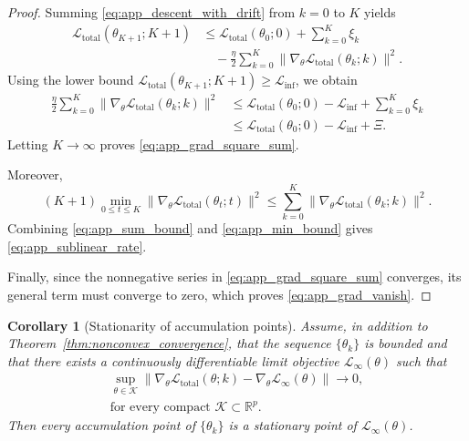 \documentclass{article}
\theoremstyle{plain}
\newtheorem{corollary}[theorem]{Corollary}
\theoremstyle{definition}
\theoremstyle{remark}
\begin{document}
\begin{proof}
	Summing \eqref{eq:app_descent_with_drift} from $k=0$ to $K$ yields
	\begin{equation}
		\begin{split}
			\mathcal{L}_{\mathrm{total}}(\theta_{K+1};K+1)
			&\leqslant
			\mathcal{L}_{\mathrm{total}}(\theta_0;0)
			+
			\sum_{k=0}^{K}\xi_k \\
			&\quad
			-
			\frac{\eta}{2}
			\sum_{k=0}^{K}
			\bigl\|
			\nabla_{\theta}\mathcal{L}_{\mathrm{total}}(\theta_k;k)
			\bigr\|^2.
		\end{split}
		\label{eq:app_telescoping}
	\end{equation}
	Using the lower bound
	$\mathcal{L}_{\mathrm{total}}(\theta_{K+1};K+1)\geqslant \mathcal{L}_{\inf}$,
	we obtain
	\begin{equation}
		\begin{split}
			\frac{\eta}{2}
			\sum_{k=0}^{K}
			\bigl\|
			\nabla_{\theta}\mathcal{L}_{\mathrm{total}}(\theta_k;k)
			\bigr\|^2
			&\leqslant
			\mathcal{L}_{\mathrm{total}}(\theta_0;0)-\mathcal{L}_{\inf}
			+\sum_{k=0}^{K}\xi_k \\
			&\leqslant
			\mathcal{L}_{\mathrm{total}}(\theta_0;0)-\mathcal{L}_{\inf}+\Xi.
		\end{split}
		\label{eq:app_sum_bound}
	\end{equation}
	Letting $K\to\infty$ proves \eqref{eq:app_grad_square_sum}.
	
	Moreover,
	\begin{equation}
		(K+1)\min_{0\leqslant t\leqslant K}
		\bigl\|
		\nabla_{\theta}\mathcal{L}_{\mathrm{total}}(\theta_t;t)
		\bigr\|^2
		\leqslant
		\sum_{k=0}^{K}
		\bigl\|
		\nabla_{\theta}\mathcal{L}_{\mathrm{total}}(\theta_k;k)
		\bigr\|^2.
		\label{eq:app_min_bound}
	\end{equation}
	Combining \eqref{eq:app_sum_bound} and \eqref{eq:app_min_bound} gives
	\eqref{eq:app_sublinear_rate}.
	
	Finally, since the nonnegative series in
	\eqref{eq:app_grad_square_sum} converges, its general term must
	converge to zero, which proves \eqref{eq:app_grad_vanish}.
\end{proof}

\begin{corollary}[Stationarity of accumulation points]
	\label{cor:stationary_points}
	Assume, in addition to
	Theorem~\ref{thm:nonconvex_convergence}, that the sequence
	$\{\theta_k\}$ is bounded and that there exists a continuously
	differentiable limit objective $\mathcal{L}_{\infty}(\theta)$ such that
	\begin{equation}
		\begin{aligned}
			\sup_{\theta\in \mathcal K}
			\bigl\|
			\nabla_{\theta}\mathcal{L}_{\mathrm{total}}(\theta;k)
			-
			\nabla_{\theta}\mathcal{L}_{\infty}(\theta)
			\bigr\|
			\to 0, \\
			\text{for every compact } \mathcal K\subset\mathbb{R}^p.
		\end{aligned}
		\label{eq:app_uniform_gradient_convergence}
	\end{equation}
	Then every accumulation point of $\{\theta_k\}$ is a stationary point of
	$\mathcal{L}_{\infty}(\theta)$.
\end{corollary}
\end{document}
